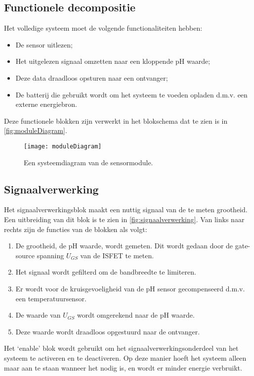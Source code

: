 \subsection{Functionele decompositie}
Het volledige systeem moet de volgende functionaliteiten hebben:

\begin{itemize}
    \item De sensor uitlezen;
    \item Het uitgelezen signaal omzetten naar een kloppende pH waarde;
    \item Deze data draadloos opsturen naar een ontvanger;
    \item De batterij die gebruikt wordt om het systeem te voeden opladen d.m.v. een externe energiebron.
\end{itemize}
Deze functionele blokken zijn verwerkt in het blokschema dat te zien is in \autoref{fig:moduleDiagram}.

\begin{figure}[ht]
    \centering
    \texttt{[image: moduleDiagram]}
    \caption{Een systeemdiagram van de sensormodule.} 
    \label{fig:moduleDiagram}
\end{figure}

\subsection{Signaalverwerking}
Het signaalverwerkingsblok maakt een nuttig signaal van de te meten grootheid. Een uitbreiding van dit blok is te zien in \autoref{fig:signaalverwerking}.
Van links naar rechts zijn de functies van de blokken als volgt:
\begin{enumerate}
    \item De grootheid, de pH waarde, wordt gemeten. Dit wordt gedaan door de gate-source spanning $U_{GS}$ van de ISFET te meten.
    \item Het signaal wordt gefilterd om de bandbreedte te limiteren.
    \item Er wordt voor de kruisgevoeligheid van de pH sensor gecompenseerd d.m.v. een temperatuursensor.
    \item De waarde van $U_{GS}$ wordt omgerekend naar de pH waarde.
    \item Deze waarde wordt draadloos opgestuurd naar de ontvanger.
\end{enumerate}
Het `enable' blok wordt gebruikt om het signaalverwerkingsonderdeel van het systeem te activeren en te deactiveren. Op deze manier hoeft het systeem alleen maar aan te staan wanneer het nodig is, en wordt er minder energie verbruikt.

